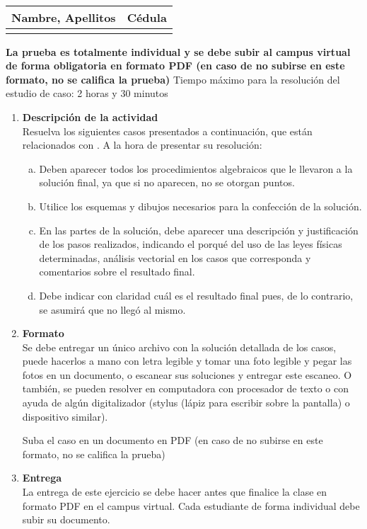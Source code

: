 \begin{center}
  {\Huge \thetitle} \\[2em]
  {\large \thecycle} %
\end{center}
\begin{center}
\begin{tabular}{|C{0.59\textwidth}|C{0.3\textwidth}|}
\hline
\textbf{Nambre, Apellitos} & \textbf{Cédula} \\ \hline
         & \\ \hline
\end{tabular}
\end{center}
\noindent
\textbf{La prueba es totalmente individual y se debe subir al campus virtual
  de forma obligatoria en formato PDF
  (en caso de no subirse en este formato, no se califica la prueba) }
Tiempo máximo para la resolución del estudio de caso: 2 horas y 30 minutos
\renewcommand{\labelenumi}{\textbf{\arabic{enumi}.}}
\begin{enumerate}
\item \textbf{Descripción de la actividad} \\
  Resuelva los siguientes casos presentados a continuación,
  que están relacionados con \topics.
  A la hora de presentar su resolución:
  \begin{enumerate}[a.]
    \item Deben aparecer todos los procedimientos algebraicos que le llevaron
      a la solución final, ya que si no aparecen, no se otorgan puntos.
    \item Utilice los esquemas y dibujos necesarios para la confección de
      la solución.
    \item En las partes de la solución, debe aparecer una descripción y
      justificación de los pasos realizados,
      indicando el porqué del uso de las leyes físicas determinadas,
      análisis vectorial en los casos que corresponda y
      comentarios sobre el resultado final.
    \item Debe indicar con claridad cuál es el resultado final pues,
      de lo contrario, se asumirá que no llegó al mismo.
  \end{enumerate}
\item \textbf{Formato}\\
  Se debe entregar un único archivo con la solución detallada de los casos,
  puede hacerlos a mano con letra legible y tomar una foto legible y
  pegar las fotos en un documento,
  o escanear sus soluciones y entregar este escaneo.
  O también, se pueden resolver en computadora con procesador de texto o
  con ayuda de algún digitalizador
  (stylus (lápiz para escribir sobre la pantalla) o dispositivo similar).

  Suba el caso en un documento en PDF
  (en caso de no subirse en este formato, no se califica la prueba)
\item \textbf{Entrega}\\
  La entrega de este ejercicio se debe hacer antes que finalice la clase
  en formato PDF en el campus virtual.
  Cada estudiante de forma individual debe subir su documento.
\end{enumerate}
